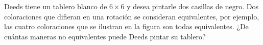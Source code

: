 Deeds tiene un tablero blanco de $6 \times 6$ y desea pintarle dos casillas de negro. Dos coloraciones que difieran en una rotación se consideran equivalentes, por ejemplo, las cuatro coloraciones que se ilustran en la figura son todas equivalentes. ¿De cuántas maneras no equivalentes puede Deeds pintar su tablero?